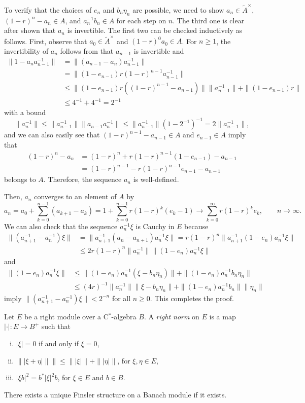 \documentclass{../../large}
\begin{document}
\begin{pf}
To verify that the choices of $e_n$ and $b_n\eta_n$ are possible, we need to show $a_n\in\tilde A^\times$, $(1-r)^n-a_n\in A$, and $a_n^{-1}b_n\in A$ for each step on $n$.
The third one is clear after shown that $a_n$ is invertible.
The first two can be checked inductively as follows.
First, observe that $a_0\in\tilde A^\times$ and $(1-r)^0a_0\in A$.
For $n\ge1$, the invertibility of $a_n$ follows from that $a_{n-1}$ is invertible and
\begin{align*}
\|1-a_na_{n-1}^{-1}\|
&=\|(a_{n-1}-a_n)a_{n-1}^{-1}\|\\
&=\|(1-e_{n-1})r(1-r)^{n-1}a_{n-1}^{-1}\|\\
&\le \|(1-e_{n-1})r((1-r)^{n-1}-a_{n-1})\|\|a_{n-1}^{-1}\|+\|(1-e_{n-1})r\|\\
&\le4^{-1}+4^{-1}=2^{-1}
\end{align*}
with a bound
\[\|a_n^{-1}\|\le\|a_{n-1}^{-1}\|\|a_{n-1}a_n^{-1}\|\le\|a_{n-1}^{-1}\|(1-2^{-1})^{-1}=2\|a_{n-1}^{-1}\|,\]
and we can also easily see that $(1-r)^{n-1}-a_{n-1}\in A$ and $e_{n-1}\in A$ imply that
\begin{align*}
(1-r)^n-a_n
&=(1-r)^n+r(1-r)^{n-1}(1-e_{n-1})-a_{n-1}\\
&=(1-r)^{n-1}-r(1-r)^{n-1}e_{n-1}-a_{n-1}
\end{align*}
belongs to $A$.
Therefore, the sequence $a_n$ is well-defined.

Then, $a_n$ converges to an element of $A$ by
\[a_n=a_0+\sum_{k=0}^{n-1}(a_{k+1}-a_k)=1+\sum_{k=0}^{n-1}r(1-r)^k(e_k-1)\to\sum_{k=0}^\infty r(1-r)^ke_k,\qquad n\to\infty.\]
We can also check that the sequence $a_n^{-1}\xi$ is Cauchy in $E$ because
\begin{align*}
\|(a_{n+1}^{-1}-a_n^{-1})\xi\|
&=\|a_{n+1}^{-1}(a_n-a_{n+1})a_n^{-1}\xi\|
=r(1-r)^n\|a_{n+1}^{-1}(1-e_n)a_n^{-1}\xi\|\\
&\le 2r(1-r)^n\|a_n^{-1}\|\|(1-e_n)a_n^{-1}\xi\|
\end{align*}
and
\begin{align*}
\|(1-e_n)a_n^{-1}\xi\|
&\le\|(1-e_n)a_n^{-1}(\xi-b_n\eta_n)\|+\|(1-e_n)a_n^{-1}b_n\eta_n\|\\
&\le(4r)^{-1}\|a_n^{-1}\|\|\xi-b_n\eta_n\|+\|(1-e_n)a_n^{-1}b_n\|\|\eta_n\|
\end{align*}
imply $\|(a_{n+1}^{-1}-a_n^{-1})\xi\|<2^{-n}$ for all $n\ge0$.
This completes the proof.
\end{pf}

\begin{prb}
Let $E$ be a right module over a C$^*$-algebra $B$.
A \emph{right norm} on $E$ is a map $|\cdot|:E\to B^+$ such that
\begin{enumerate}[(i)]
\item $|\xi|=0$ if and only if $\xi=0$,
\item $\||\xi+\eta|\|\|\le\||\xi|\|+\||\eta|\|$, for $\xi,\eta\in E$,
\item $|\xi b|^2=b^*|\xi|^2b$, for $\xi\in E$ and $b\in B$.
\end{enumerate}
There exists a unique Finsler structure on a Banach module if it exists.
\end{prb}
\end{document}
